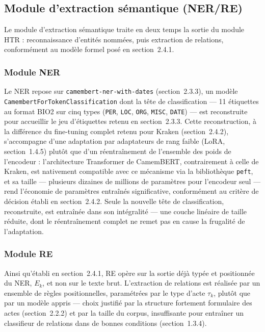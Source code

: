\subsection{Module d'extraction sémantique (NER/RE)}

Le module d'extraction sémantique traite en deux temps la sortie du module HTR : reconnaissance d'entités nommées, puis extraction de relations, conformément au modèle formel posé en section~2.4.1.

\subsubsection*{Module NER}

Le NER repose sur \texttt{camembert-ner-with-dates} (section~2.3.3), un modèle \texttt{CamembertForTokenClassification} dont la tête de classification --- 11 étiquettes au format BIO2 sur cinq types (\texttt{PER}, \texttt{LOC}, \texttt{ORG}, \texttt{MISC}, \texttt{DATE}) --- est reconstruite pour accueillir le jeu d'étiquettes retenu en section~2.3.3.
Cette reconstruction, à la différence du fine-tuning complet retenu pour Kraken (section~2.4.2), s'accompagne d'une adaptation par adaptateurs de rang faible (LoRA, section~1.4.5) plutôt que d'un réentraînement de l'ensemble des poids de l'encodeur : l'architecture Transformer de CamemBERT, contrairement à celle de Kraken, est nativement compatible avec ce mécanisme via la bibliothèque \texttt{peft}, et sa taille --- plusieurs dizaines de millions de paramètres pour l'encodeur seul --- rend l'économie de paramètres entraînés significative, conformément au critère de décision établi en section~2.4.2.
Seule la nouvelle tête de classification, reconstruite, est entraînée dans son intégralité --- une couche linéaire de taille réduite, dont le réentraînement complet ne remet pas en cause la frugalité de l'adaptation.

\subsubsection*{Module RE}

Ainsi qu'établi en section~2.4.1, RE opère sur la sortie déjà typée et positionnée du NER, $E_k$, et non sur le texte brut.
L'extraction de relations est réalisée par un ensemble de règles positionnelles, paramétrées par le type d'acte $\tau_k$, plutôt que par un modèle appris --- choix justifié par la structure fortement formulaire des actes (section~2.2.2) et par la taille du corpus, insuffisante pour entraîner un classifieur de relations dans de bonnes conditions (section~1.3.4).

